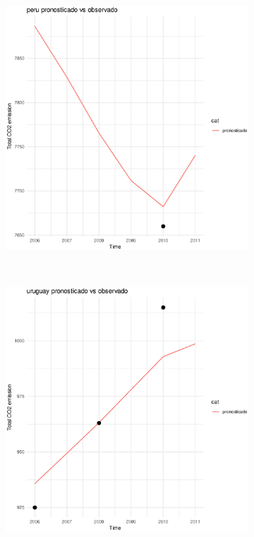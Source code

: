 \documentclass[twocolumn]{article}
\begin{document}
\begin{figure}
\begin{subfigure}{.3\textwidth}
        \end{subfigure}
        \hspace*{\fill}
        \begin{subfigure}{.3\textwidth}
            \includegraphics[width=\linewidth]{images/peru_imputation.eps}
        \end{subfigure}\\
        \begin{subfigure}{.3\textwidth}
            \includegraphics[width=\linewidth]{images/uruguay_imputation.eps}
        \end{subfigure}    
\end{figure}
\end{document}
